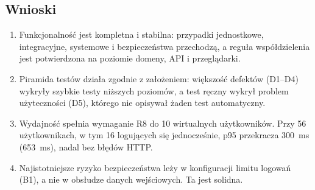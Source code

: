 \documentclass[a4paper,11pt]{article}
\begin{document}
\subsection{Wnioski}
\begin{enumerate}
  \item Funkcjonalność jest kompletna i stabilna: przypadki jednostkowe, integracyjne,
        systemowe i bezpieczeństwa przechodzą, a reguła współdzielenia jest potwierdzona
        na poziomie domeny, API i przeglądarki.
  \item Piramida testów działa zgodnie z założeniem: większość defektów (D1–D4) wykryły
        szybkie testy niższych poziomów, a test ręczny wykrył problem użyteczności (D5),
        którego nie opisywał żaden test automatyczny.
  \item Wydajność spełnia wymaganie R8 do 10 wirtualnych użytkowników. Przy 56 użytkownikach,
        w tym 16 logujących się jednocześnie, p95 przekracza 300~ms (653~ms), nadal bez błędów HTTP.
  \item Najistotniejsze ryzyko bezpieczeństwa leży w konfiguracji limitu logowań (B1),
        a nie w obsłudze danych wejściowych. Ta jest solidna.
\end{enumerate}
\end{document}
